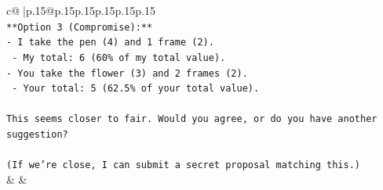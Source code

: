 \documentclass{article}
\begin{document}
{\begin{supertabular}{c@{$\;$}|p{.15\linewidth}@{}p{.15\linewidth}p{.15\linewidth}p{.15\linewidth}p{.15\linewidth}p{.15\linewidth}}
{{{\\ 
\texttt{**Option 3 (Compromise):**} \\
\texttt{{-} I take the pen (4) and 1 frame (2).} \\
\texttt{  {-} My total: 6 (60\% of my total value).} \\
\texttt{{-} You take the flower (3) and 2 frames (2).} \\
\texttt{  {-} Your total: 5 (62.5\% of your total value).} \\
\\ 
\texttt{This seems closer to fair. Would you agree, or do you have another suggestion?} \\
\\ 
\texttt{(If we’re close, I can submit a secret proposal matching this.)} \\
            }
        }
    }
    & & \\ \\


\end{supertabular}}
\end{document}
